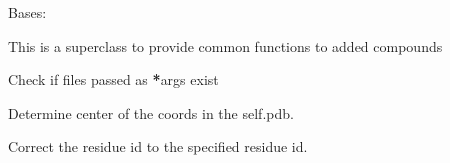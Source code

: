 \documentclass[letterpaper,10pt,english]{sphinxmanual}
\begin{document}
\begin{fulllineitems}
\label{\detokenize{protein:protein.Compound}}
\pysigstartsignatures
{}
\pysigstopsignatures
\sphinxAtStartPar
Bases: 

\sphinxAtStartPar
This is a super\sphinxhyphen{}class to provide common functions to added compounds

\begin{fulllineitems}
\label{\detokenize{protein:protein.Compound.check_files}}
\pysigstartsignatures
{}
\pysigstopsignatures
\sphinxAtStartPar
Check if files passed as {\color{red}\bfseries{}*}args exist

\end{fulllineitems}


\begin{fulllineitems}
\label{\detokenize{protein:protein.Compound.calculate_center}}
\pysigstartsignatures
{}
\pysigstopsignatures
\sphinxAtStartPar
Determine center of the coords in the self.pdb.

\end{fulllineitems}


\begin{fulllineitems}
\label{\detokenize{protein:protein.Compound.correct_resid}}
\pysigstartsignatures
{}
\pysigstopsignatures
\sphinxAtStartPar
Correct the residue id to the specified residue id.

\end{fulllineitems}


\end{fulllineitems}
\end{document}
